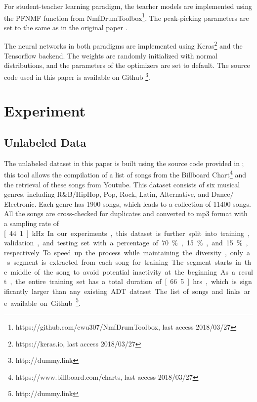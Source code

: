 \documentclass{article}
\newcommand{\comment}[1]{{\textcolor{blue}{#1}}}
\begin{document}
For student-teacher learning paradigm, the teacher models are implemented using the PFNMF function from NmfDrumToolbox\footnote{https://github.com/cwu307/NmfDrumToolbox, last access 2018/03/27}. The peak-picking parameters are set to the same as in the original paper \cite{Wu2017}.

The neural networks in both paradigms are implemented using Keras\footnote{https://keras.io, last access 2018/03/27} and the Tensorflow \cite{Abadi2016} backend. The weights are randomly initialized with normal distributions, and the parameters of the optimizers are set to default. The source code used in this paper is available on Github \footnote{http://dummy.link}.

\section{Experiment}
\label{sec:experiment}

\subsection{Unlabeled Data}

The unlabeled dataset in this paper is built using the source code provided in \cite{Wu2017}; this tool allows the compilation of a list of songs from the Billboard Chart\footnote{https://www.billboard.com/charts, last access 2018/03/27} and the retrieval of these songs from Youtube. This dataset consists of six musical genres, including R\&B$\slash$HipHop, Pop, Rock, Latin, Alternative, and  Dance$\slash$Electronic. Each genre has 1900 songs, which leads to a collection of 11400 songs. All the songs are cross-checked for duplicates and converted to mp3 format with a sampling rate of \unit[44.1]{kHz}. In our experiments, this dataset is further split into training, validation, and testing set with a percentage of 70\%, 15\%, and 15\%, respectively. To speed up the process while maintaining the diversity, only a \unit[30]{s} segment is extracted from each song for training. The segment starts in the middle of the song to avoid potential inactivity at the beginning. As a result, the entire training set has a total duration of \unit[66.5]{hrs}, which is significantly larger than any existing ADT dataset. The list of songs and links are available on Github\footnote{http://dummy.link}. %
\end{document}
